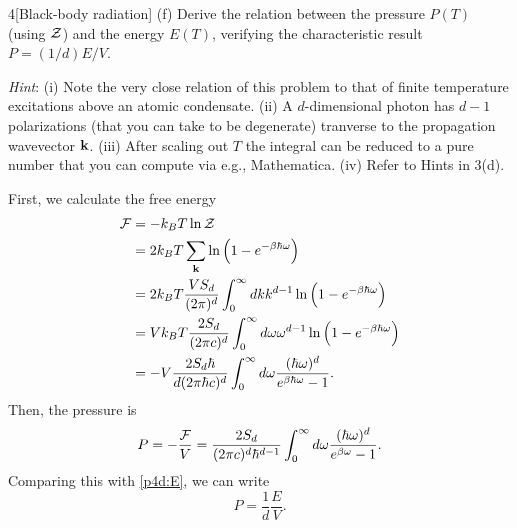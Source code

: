 \documentclass[12pt]{article}
\begin{document}
\begin{problem}{4}[Black-body radiation]
(f) Derive the relation between the pressure $P(T)$ (using $\mathcal{Z}$) and the energy
$E(T)$, verifying the characteristic result $P=(1/d)E/V$.

\textit{Hint}: (i) Note the very close relation of this problem to that of
finite temperature excitations above an atomic condensate. (ii) A
$d$-dimensional photon has $d-1$ polarizations (that you can take to be
degenerate) tranverse to the propagation wavevector $\vb{k}$. (iii) After
scaling out $T$ the integral can be reduced to a pure number that you can
compute via e.g., Mathematica. (iv) Refer to Hints in 3(d).
\begin{solution}
    First, we calculate the free energy
\begin{align}
    \mathcal{F}&=-k_BT\ln\mathcal{Z} \notag\\
       &=2k_BT\sum_{\vb{k}}\ln\qty(1-e^{-\beta\hbar\omega})\notag\\
       &=2k_BT\frac{VS_d}{(2\pi)^d}\int_0^\infty dk
       k^{d-1}\ln\qty(1-e^{-\beta\hbar\omega})\notag\\
       &=Vk_BT\frac{2S_d}{(2\pi c)^d}\int_0^\infty
       d\omega\omega^{d-1}\ln\qty(1-e^{-\beta\hbar\omega})\notag\\
       &=-V\frac{2S_d\hbar}{d(2\pi \hbar c)^d}\int_0^\infty
       d\omega\frac{(\hbar\omega)^d}{e^{\beta\hbar\omega}-1}.
\end{align}
Then, the pressure is
\begin{equation}
    P=-\frac{\mathcal{F}}{V}=\frac{2S_d}{(2\pi c)^d\hbar^{d-1}}\int_0^\infty
    d\omega\frac{(\hbar\omega)^d}{e^{\beta\omega}-1}. 
\end{equation}
Comparing this with \eqref{p4d:E}, we can write
\begin{equation}
    P=\frac1d\frac{E}{V}. 
\end{equation}
\end{solution}
\end{problem}
\newpage
\end{document}
